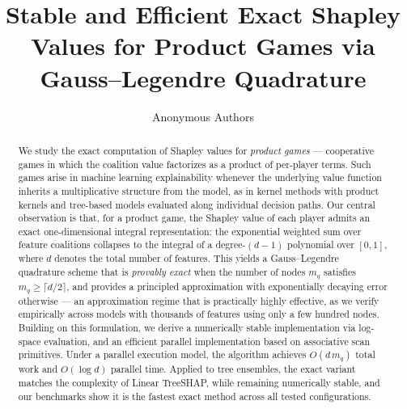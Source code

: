 \documentclass{article}
\title{Stable and Efficient Exact Shapley Values for Product Games via Gauss--Legendre Quadrature}
\author{Anonymous Authors}
\begin{document}
\maketitle

\begin{abstract}
We study the exact computation of Shapley values for \emph{product games} — cooperative games in which the coalition value factorizes as a product of per-player terms. Such games arise in machine learning explainability whenever the underlying value function inherits a multiplicative structure from the model, as in kernel methods with product kernels and tree-based models evaluated along individual decision paths. Our central observation is that, for a product game, the Shapley value of each player admits an exact one-dimensional integral representation: the exponential weighted sum over feature coalitions collapses to the integral of a degree-$(d-1)$ polynomial over $[0,1]$, where $d$ denotes the total number of features. This yields a Gauss--Legendre quadrature scheme that is \emph{provably exact} when the number of nodes $m_q$ satisfies $m_q \geq \lceil d/2 \rceil$, and provides a principled approximation with exponentially decaying error otherwise — an approximation regime that is practically highly effective, as we verify empirically across models with thousands of features using only a few hundred nodes. Building on this formulation, we derive a numerically stable implementation via log-space evaluation, and an efficient parallel implementation based on associative scan primitives. Under a parallel execution model, the algorithm achieves $O(d\,m_q)$ total work and $O(\log d)$ parallel time. Applied to tree ensembles, the exact variant matches the complexity of Linear TreeSHAP, while remaining numerically stable, and our benchmarks show it is the fastest exact method across all tested configurations.


\end{abstract}
\end{document}
